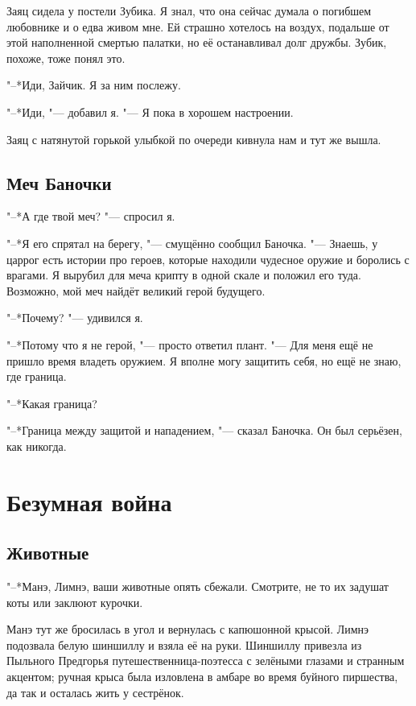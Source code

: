 \documentclass[a4paper,10pt]{book}
\begin{document}
Заяц сидела у постели Зубика. Я знал, что она сейчас думала о погибшем 
любовнике и о едва живом мне. Ей страшно хотелось на воздух, подальше от этой 
наполненной смертью палатки, но её останавливал долг дружбы. Зубик, похоже, 
тоже понял это.

"--*Иди, Зайчик. Я за ним послежу.

"--*Иди, "--- добавил я. "--- Я пока в хорошем настроении.

Заяц с натянутой горькой улыбкой по очереди кивнула нам и тут же вышла.

 
\section{Меч Баночки}

"--*А где твой меч? "--- спросил я.

"--*Я его спрятал на берегу, "--- смущённо сообщил Баночка. "--- Знаешь, у 
царрог есть истории про героев, которые находили чудесное оружие и боролись с 
врагами. Я вырубил для меча крипту в одной скале и положил его туда. Возможно, 
мой меч найдёт великий герой будущего.

"--*Почему? "--- удивился я.

"--*Потому что я не герой, "--- просто ответил плант. "--- Для меня ещё не 
пришло время владеть оружием. Я вполне могу защитить себя, но ещё не знаю, где 
граница.

"--*Какая граница?

"--*Граница между защитой и нападением, "--- сказал Баночка. Он был серьёзен, 
как никогда.

\chapter{Безумная война}
 
 \section{Животные}
 
 "--*Манэ, Лимнэ, ваши животные опять сбежали. Смотрите, не то их задушат коты или заклюют курочки.
 
 Манэ тут же бросилась в угол и вернулась с капюшонной крысой. Лимнэ подозвала белую шиншиллу и взяла её на руки.
 Шиншиллу привезла из Пыльного Предгорья путешественница-поэтесса с зелёными глазами и странным акцентом; ручная крыса была изловлена в амбаре во время буйного пиршества, да так и осталась жить у сестрёнок.
 
\end{document}
